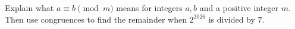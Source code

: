 Explain what $a\equiv b\pmod m$ means for integers $a,b$ and a positive integer $m$. Then use congruences to find the remainder when $2^{2026}$ is divided by $7$.
